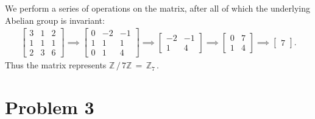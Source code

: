 \documentclass[11pt]{article}
\begin{document}
We perform a series of operations on the matrix, after all of which the underlying Abelian group is invariant:
\begin{align*}
  \begin{bmatrix} 3 & 1 & 2 \\ 1 & 1 & 1 \\ 2 & 3 & 6 \end{bmatrix} \implies \begin{bmatrix} 0 & -2 & -1 \\ 1 & 1 & 1 \\ 0 & 1 & 4 \end{bmatrix} \implies \begin{bmatrix} -2 & -1 \\ 1 & 4 \end{bmatrix} \implies \begin{bmatrix} 0 & 7 \\ 1 & 4 \end{bmatrix} \implies \begin{bmatrix} 7 \end{bmatrix}.
\end{align*}
Thus the matrix represents $\mathbb{Z} \, / \, 7 \mathbb{Z} \, = \, \boxed{\mathbb{Z}_{7}}\,$.


\section{Problem 3}
\end{document}
